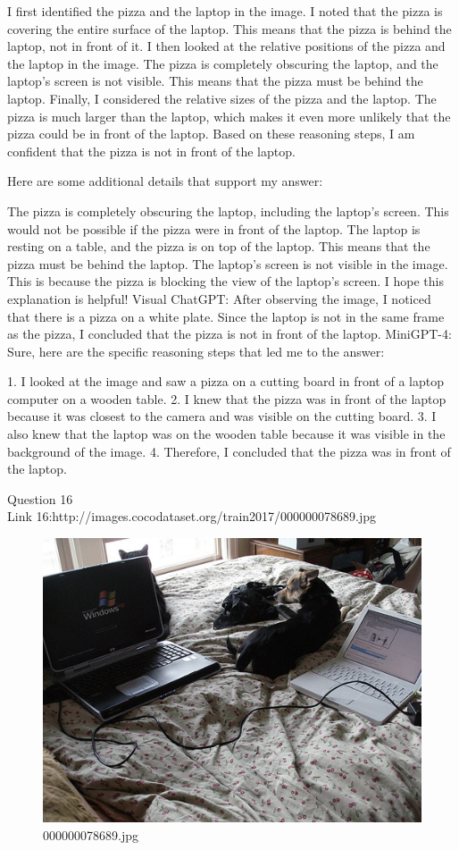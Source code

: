 \begin{enumerate}
        I first identified the pizza and the laptop in the image.
        I noted that the pizza is covering the entire surface of the laptop. This means that the pizza is behind the laptop, not in front of it.
        I then looked at the relative positions of the pizza and the laptop in the image. The pizza is completely obscuring the laptop, and the laptop's screen is not visible. This means that the pizza must be behind the laptop.
        Finally, I considered the relative sizes of the pizza and the laptop. The pizza is much larger than the laptop, which makes it even more unlikely that the pizza could be in front of the laptop.
        Based on these reasoning steps, I am confident that the pizza is not in front of the laptop.

        Here are some additional details that support my answer:

        The pizza is completely obscuring the laptop, including the laptop's screen. This would not be possible if the pizza were in front of the laptop.
        The laptop is resting on a table, and the pizza is on top of the laptop. This means that the pizza must be behind the laptop.
        The laptop's screen is not visible in the image. This is because the pizza is blocking the view of the laptop's screen.
        I hope this explanation is helpful!
        \subitem Visual ChatGPT: After observing the image, I noticed that there is a pizza on a white plate. Since the laptop is not in the same frame as the pizza, I concluded that the pizza is not in front of the laptop.
        \subitem MiniGPT-4: Sure, here are the specific reasoning steps that led me to the answer:

        1. I looked at the image and saw a pizza on a cutting board in front of a laptop computer on a wooden table.
        2. I knew that the pizza was in front of the laptop because it was closest to the camera and was visible on the cutting board.
        3. I also knew that the laptop was on the wooden table because it was visible in the background of the image.
        4. Therefore, I concluded that the pizza was in front of the laptop.
    \end{enumerate}
Question 16\\
Link 16:http://images.cocodataset.org/train2017/000000078689.jpg
    \begin{figure}[h]
        \centering
        \includegraphics[width=0.8\linewidth]{../image set/easy/000000078689.jpg}
        \caption{000000078689.jpg}
    \end{figure}
